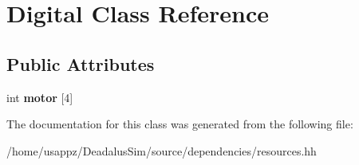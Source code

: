 \hypertarget{classDigital}{\section{\-Digital \-Class \-Reference}
\label{classDigital}
}
\subsection*{\-Public \-Attributes}
\begin{DoxyCompactItemize}
\item 
\hypertarget{classDigital_a2f6751d5da0ca6b7538fdfed2e0ef8b5}{int {\bfseries motor} \mbox{[}4\mbox{]}}\label{classDigital_a2f6751d5da0ca6b7538fdfed2e0ef8b5}

\end{DoxyCompactItemize}


\-The documentation for this class was generated from the following file\-:\begin{DoxyCompactItemize}
\item 
/home/usappz/\-Deadalus\-Sim/source/dependencies/resources.\-hh\end{DoxyCompactItemize}
